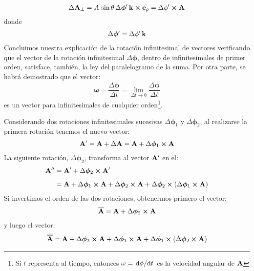 \documentclass[12pt]{article}
\begin{document}
\begin{align}
    \Delta \vb{A}_{\perp} = A \, \sin \theta \, \Delta \bm{\phi}^{\prime} \, \vb{k} \cp \vb{e}_{\rho} = \Delta \phi^{\prime} \cp \vb{A}
    \label{eq:ecuacion_01_72}
\end{align}
donde
\begin{align*}
    \Delta \bm{\phi}^{\prime} = \Delta \phi^{\prime} \, \vb{k}
\end{align*}
Concluimos nuestra explicación de la rotación infinitesimal de vectores verificando que el vector de la rotación infinitesimal $\Delta \bm{\phi}$, dentro de infinitesimales de primer orden, satisface, también, la ley del paralelogramo de la suma. Por otra parte, se habrá demostrado que el vector:
\begin{align*}
    \bm{\omega} = \dfrac{\Delta \bm{\phi}}{\Delta t} = \lim_{\Delta t \to 0} \dfrac{\Delta \bm{\phi}}{\Delta t}
\end{align*}
es un vector para infinitesimales de cualquier orden\footnote{Si $t$ representa al tiempo, entonces $\vb{\omega} = \dv*{\vb{\phi}}{t}$ es la velocidad angular de $\vb{A}$}.
\par
Considerando dos rotaciones infinitesimales sucesivas $\Delta \bm{\phi}_{1}$ y $\Delta \bm{\phi}_{2}$, al realizarse la primera rotación tenemos el nuevo vector:
\begin{align}
    \vb{A}^{\prime} = \vb{A} + \Delta \vb{A} = \vb{A} + \Delta \bm{\phi}_{1} \cp \vb{A}
    \label{eq:ecuacion_01_73}
\end{align}
La siguiente rotación, $\Delta \bm{\phi}_{2}$, transforma al vector $\vb{A}^{\prime}$ en el:
\begin{align}
\begin{aligned}[b]
\vb{A}^{\prime \prime} &= \vb{A}^{\prime} + \Delta \bm{\phi}_{2} \cp \vb{A}^{\prime} \\[0.5em]
&= \vb{A} + \Delta \bm{\phi}_{1} \cp \vb{A} + \Delta \bm{\phi}_{2} \cp \vb{A} + \Delta \bm{\phi}_{2} \cp \left( \Delta \bm{\phi}_{1} \cp \vb{A} \right) 
\end{aligned}
\label{eq:ecuacion_01_74}
\end{align}
Si invertimos el orden de las dos rotaciones, obtenermos primero el vector:
\begin{align}
    \overline{\vb{A}} = \vb{A} + \Delta \bm{\phi}_{2} \cp \vb{A}
    \label{eq:ecuacion_01_75}
\end{align}
y luego el vector:
\begin{align}
    \overline{\overline{\vb{A}}} = \vb{A} + \Delta \bm{\phi}_{2} \cp \vb{A} + \Delta \bm{\phi}_{1} \cp \vb{A} + \Delta \bm{\phi}_{1} \cp \left( \Delta \bm{\phi}_{2} \cp \vb{A} \right)
    \label{eq:ecuacion_01_76}
\end{align}
\end{document}

